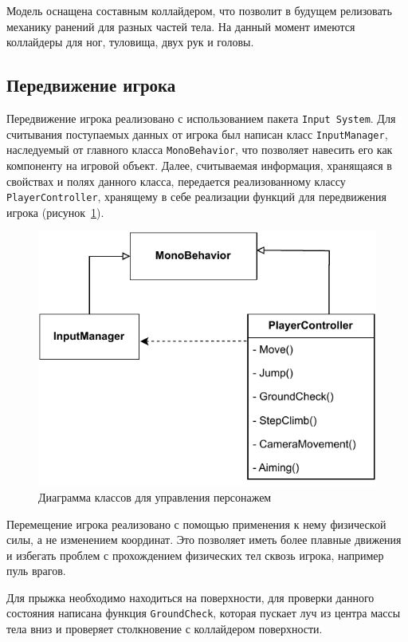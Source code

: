 Модель оснащена составным коллайдером, что позволит в будущем релизовать механику ранений для разных частей тела. На данный момент имеются коллайдеры для ног, туловища, двух рук и головы.

\subsection{Передвижение игрока}
Передвижение игрока реализовано с использованием пакета \texttt{Input System}. Для считывания поступаемых данных от игрока был написан класс \texttt{InputManager}, наследуемый от главного класса \texttt{MonoBehavior}, что позволяет навесить его как компоненту на игровой объект. Далее, считываемая информация, хранящаяся в свойствах и полях данного класса, передается реализованному классу \texttt{PlayerController}, хранящему в себе реализации функций для передвижения игрока (рисунок~\ref{fig:Controller}).

\begin{figure}[H]
    \centering
    \includegraphics[width=\textwidth]{figures/PlayerController.pdf}
    \caption{Диаграмма классов для управления персонажем}
    \label{fig:Controller}
\end{figure}

Перемещение игрока реализовано с помощью применения к нему физической силы, а не изменением координат. Это позволяет иметь более плавные движения и избегать проблем с прохождением физических тел сквозь игрока, например пуль врагов. 

Для прыжка необходимо находиться на поверхности, для проверки данного состояния написана функция \texttt{GroundCheck}, которая пускает луч из центра массы тела вниз и проверяет столкновение с коллайдером поверхности.

